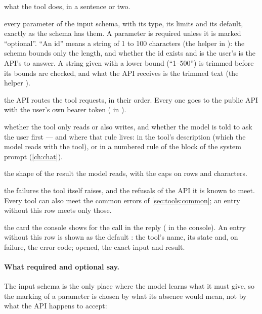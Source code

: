\begin{description}[style=multiline, leftmargin=24mm, labelwidth=22mm, labelsep=2mm,
  font=\sffamily\bfseries\footnotesize\color{ink}, itemsep=2pt]
  \item[Does] what the tool does, in a sentence or two.
  \item[Input] every parameter of the input schema, with its type, its limits and its default,
    exactly as the schema has them. A parameter is required unless it is marked
    \enquote{optional}. \enquote{An id} means a string of 1 to 100 characters (the helper
     in ): the schema bounds only the length, and whether
    the id exists and is the user's is the API's to answer. A string given with a lower bound
    (\enquote{1--500}) is trimmed before its bounds are checked, and what the API receives is
    the trimmed text (the helper ).
  \item[Calls] the API routes the tool requests, in their order. Every one goes to the public
    API with the user's own bearer token ( in ).
  \item[Kind] whether the tool only reads or also writes, and whether the model is told to
    ask the user first --- and where that rule lives: in the tool's description (which the
    model reads with the tool), or in a numbered rule of the  block of the system
    prompt  (\cref{ch:chat}).
  \item[Returns] the shape of the result the model reads, with the caps on rows and characters.
  \item[Errors] the failures the tool itself raises, and the refusals of the API it is known
    to meet. Every tool can also meet the common errors of \cref{sec:tools:common}; an entry
    without this row meets only those.
  \item[Console] the card the console shows for the call in the reply
    ( in the console). An entry without this row is shown as
    the default : the tool's name, its state and, on failure, the error code;
    opened, the exact input and result.
\end{description}

\paragraph{What required and optional say.}\label{sec:tools:marking} The input schema is the
only place where the model learns what it must give, so the marking of a parameter is chosen
by what its absence would mean, not by what the API happens to accept:

